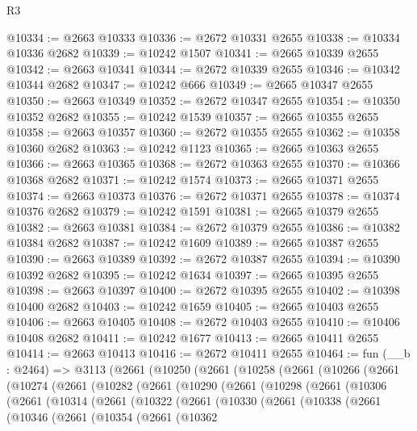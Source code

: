 \begin{lexlean}{R3}
\begin{coremodule}
@10334 := @2663 @10333
@10336 := @2672 @10331 @2655
@10338 := @10334 @10336 @2682
@10339 := @10242 @1507
@10341 := @2665 @10339 @2655
@10342 := @2663 @10341
@10344 := @2672 @10339 @2655
@10346 := @10342 @10344 @2682
@10347 := @10242 @666
@10349 := @2665 @10347 @2655
@10350 := @2663 @10349
@10352 := @2672 @10347 @2655
@10354 := @10350 @10352 @2682
@10355 := @10242 @1539
@10357 := @2665 @10355 @2655
@10358 := @2663 @10357
@10360 := @2672 @10355 @2655
@10362 := @10358 @10360 @2682
@10363 := @10242 @1123
@10365 := @2665 @10363 @2655
@10366 := @2663 @10365
@10368 := @2672 @10363 @2655
@10370 := @10366 @10368 @2682
@10371 := @10242 @1574
@10373 := @2665 @10371 @2655
@10374 := @2663 @10373
@10376 := @2672 @10371 @2655
@10378 := @10374 @10376 @2682
@10379 := @10242 @1591
@10381 := @2665 @10379 @2655
@10382 := @2663 @10381
@10384 := @2672 @10379 @2655
@10386 := @10382 @10384 @2682
@10387 := @10242 @1609
@10389 := @2665 @10387 @2655
@10390 := @2663 @10389
@10392 := @2672 @10387 @2655
@10394 := @10390 @10392 @2682
@10395 := @10242 @1634
@10397 := @2665 @10395 @2655
@10398 := @2663 @10397
@10400 := @2672 @10395 @2655
@10402 := @10398 @10400 @2682
@10403 := @10242 @1659
@10405 := @2665 @10403 @2655
@10406 := @2663 @10405
@10408 := @2672 @10403 @2655
@10410 := @10406 @10408 @2682
@10411 := @10242 @1677
@10413 := @2665 @10411 @2655
@10414 := @2663 @10413
@10416 := @2672 @10411 @2655
@10464 := fun (__b : @2464) =>
  @3113
    (@2661
      (@10250
        (@2661
          (@10258
            (@2661
              (@10266
                (@2661
                  (@10274
                    (@2661
                      (@10282
                        (@2661
                          (@10290
                            (@2661
                              (@10298
                                (@2661
                                  (@10306
                                    (@2661
                                      (@10314
                                        (@2661
                                          (@10322
                                            (@2661
                                              (@10330
                                                (@2661
                                                  (@10338
                                                    (@2661
                                                      (@10346
                                                        (@2661
                                                          (@10354
                                                            (@2661
                                                              (@10362

\end{coremodule}
\end{lexlean}
